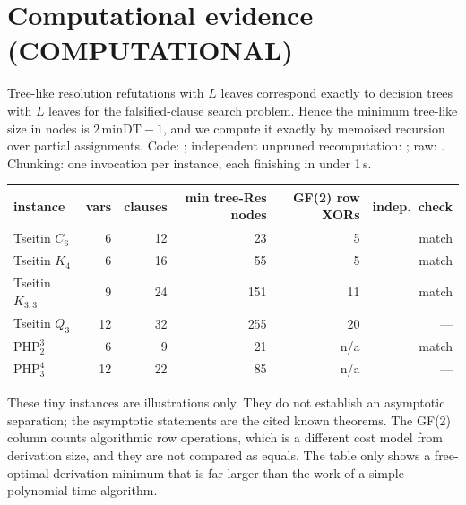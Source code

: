 \documentclass[11pt]{article}
\theoremstyle{definition}
\begin{document}
\section{Computational evidence (COMPUTATIONAL)}
Tree-like resolution refutations with $L$ leaves correspond exactly to decision trees with $L$
leaves for the falsified-clause search problem. Hence the minimum tree-like size in nodes is
$2\,\mathrm{minDT}-1$, and we compute it exactly by memoised recursion over partial
assignments. Code: ; independent
unpruned recomputation: ; raw:
. Chunking: one invocation per instance, each
finishing in under 1\,s.
\begin{center}\begin{tabular}{lrrrrr}\toprule
instance & vars & clauses & min tree-Res nodes & GF(2) row XORs & indep.\ check\\\midrule
Tseitin $C_6$ & 6 & 12 & 23 & 5 & match\\
Tseitin $K_4$ & 6 & 16 & 55 & 5 & match\\
Tseitin $K_{3,3}$ & 9 & 24 & 151 & 11 & match\\
Tseitin $Q_3$ & 12 & 32 & 255 & 20 & --- \\
$\mathrm{PHP}^3_2$ & 6 & 9 & 21 & n/a & match\\
$\mathrm{PHP}^4_3$ & 12 & 22 & 85 & n/a & --- \\\bottomrule\end{tabular}\end{center}
These tiny instances are illustrations only. They do not establish an asymptotic separation;
the asymptotic statements are the cited known theorems. The GF(2) column counts algorithmic
row operations, which is a different cost model from derivation size, and they are not
compared as equals. The table only shows a free-optimal derivation minimum that is far
larger than the work of a simple polynomial-time algorithm.
\end{document}
